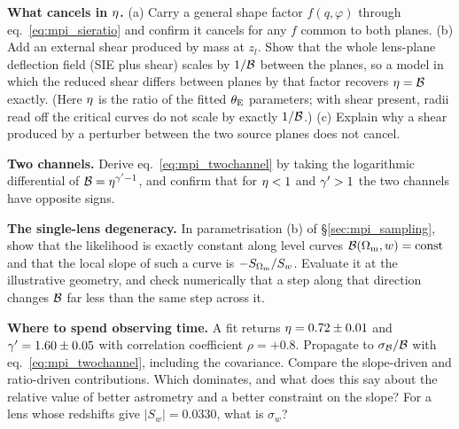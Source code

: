 \begin{exercise}
\label{ex:mpi_shape_shear}
\textbf{What cancels in $\eta$.}  (a) Carry a general shape factor
$f(q,\varphi)$ through eq.~\eqref{eq:mpi_sieratio} and confirm it cancels
for any $f$ common to both planes.  (b) Add an external shear produced by
mass at $z_l$.  Show that the whole lens-plane deflection field (SIE plus
shear) scales by $1/\mathcal{B}$ between the planes, so a model in which the
reduced shear differs between planes by that factor recovers
$\eta=\mathcal{B}$ exactly.  (Here $\eta$ is the ratio of the fitted
$\theta_{\mathrm{E}}$ parameters; with shear present, radii read off the critical
curves do not scale by exactly $1/\mathcal{B}$.)  (c) Explain why a shear produced by a perturber
between the two source planes does not cancel.
\end{exercise}

\begin{exercise}
\label{ex:mpi_two_channel}
\textbf{Two channels.}  Derive eq.~\eqref{eq:mpi_twochannel} by taking
the logarithmic differential of $\mathcal{B}=\eta^{\gamma'-1}$, and confirm
that for $\eta<1$ and $\gamma'>1$ the two channels have opposite signs.
\end{exercise}

\begin{exercise}
\label{ex:mpi_degeneracy}
\textbf{The single-lens degeneracy.}  In parametrisation (b) of
\S\ref{sec:mpi_sampling}, show that the likelihood is exactly constant
along level curves $\mathcal{B}(\Omega_{\mathrm{m}},w)=\text{const}$ and that the local
slope of such a curve is $-S_{\Omega_{\mathrm{m}}}/S_w$.  Evaluate it at the
illustrative geometry, and check numerically that a step along that
direction changes $\mathcal{B}$ far less than the same step across it.
\end{exercise}

\begin{exercise}
\label{ex:mpi_error_budget}
\textbf{Where to spend observing time.}  A fit returns
$\eta=0.72\pm0.01$ and $\gamma'=1.60\pm0.05$ with correlation coefficient
$\rho=+0.8$.  Propagate to $\sigma_{\mathcal{B}}/\mathcal{B}$ with
eq.~\eqref{eq:mpi_twochannel}, including the covariance.  Compare the
slope-driven and ratio-driven contributions.  Which dominates, and what
does this say about the relative value of better astrometry and a
better constraint on the slope?  For a lens whose redshifts give $|S_w|=0.0330$,
what is $\sigma_w$?
\end{exercise}
